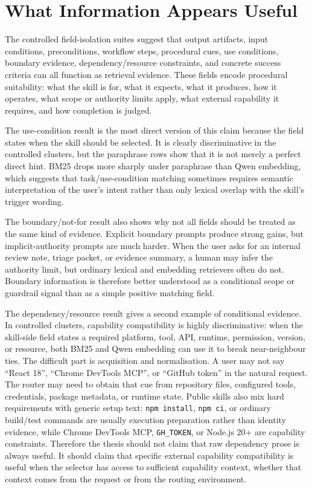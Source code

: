 \section{What Information Appears Useful}

The controlled field-isolation suites suggest that output artifacts, input conditions, preconditions, workflow steps, procedural cues, use conditions, boundary evidence, dependency/resource constraints, and concrete success criteria can all function as retrieval evidence. These fields encode procedural suitability: what the skill is for, what it expects, what it produces, how it operates, what scope or authority limits apply, what external capability it requires, and how completion is judged.

The use-condition result is the most direct version of this claim because the field states when the skill should be selected. It is clearly discriminative in the controlled clusters, but the paraphrase rows show that it is not merely a perfect direct hint. BM25 drops more sharply under paraphrase than Qwen embedding, which suggests that task/use-condition matching sometimes requires semantic interpretation of the user's intent rather than only lexical overlap with the skill's trigger wording.

The boundary/not-for result also shows why not all fields should be treated as the same kind of evidence. Explicit boundary prompts produce strong gains, but implicit-authority prompts are much harder. When the user asks for an internal review note, triage packet, or evidence summary, a human may infer the authority limit, but ordinary lexical and embedding retrievers often do not. Boundary information is therefore better understood as a conditional scope or guardrail signal than as a simple positive matching field.

The dependency/resource result gives a second example of conditional evidence. In controlled clusters, capability compatibility is highly discriminative: when the skill-side field states a required platform, tool, API, runtime, permission, version, or resource, both BM25 and Qwen embedding can use it to break near-neighbour ties. The difficult part is acquisition and normalisation. A user may not say ``React 18'', ``Chrome DevTools MCP'', or ``GitHub token'' in the natural request. The router may need to obtain that cue from repository files, configured tools, credentials, package metadata, or runtime state. Public skills also mix hard requirements with generic setup text: \texttt{npm install}, \texttt{npm ci}, or ordinary build/test commands are usually execution preparation rather than identity evidence, while Chrome DevTools MCP, \texttt{GH\_TOKEN}, or Node.js 20+ are capability constraints. Therefore the thesis should not claim that raw dependency prose is always useful. It should claim that specific external capability compatibility is useful when the selector has access to sufficient capability context, whether that context comes from the request or from the routing environment.

